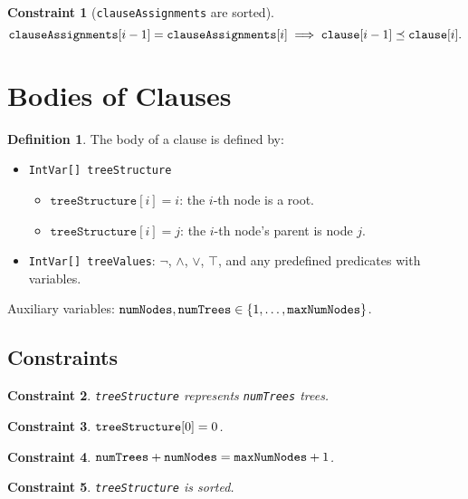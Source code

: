 \documentclass{article}
\newtheorem{constraint}{Constraint}
\theoremstyle{definition}
\newtheorem{definition}{Definition}
\newcommand{\variable}[1]{\texttt{\textup{#1}}}
\begin{document}
\begin{constraint}[\variable{clauseAssignments} are sorted]
  \[
    \variable{clauseAssignments}[i-1] = \variable{clauseAssignments}[i] \implies
    \variable{clause}[i-1] \preceq \variable{clause}[i].
  \]
\end{constraint}

\section{Bodies of Clauses}

\begin{definition}
  The body of a clause is defined by:
  \begin{itemize}
  \item \variable{IntVar[] treeStructure}
    \begin{itemize}
    \item $\texttt{treeStructure}[i] = i$: the $i$-th node is a root.
    \item $\texttt{treeStructure}[i] = j$: the $i$-th node's parent is node $j$.
    \end{itemize}
  \item \variable{IntVar[] treeValues}: $\neg$, $\land$, $\lor$, $\top$, and any
    predefined predicates with variables.
  \end{itemize}
\end{definition}

Auxiliary variables: $\variable{numNodes}, \variable{numTrees} \in \{ 1, \dots,
\variable{maxNumNodes} \}$.

\subsection{Constraints}

\begin{constraint}
  \variable{treeStructure} represents \variable{numTrees} trees.
\end{constraint}

\begin{constraint}
  $\variable{treeStructure}[0] = 0$.
\end{constraint}

\begin{constraint}
  $\variable{numTrees} + \variable{numNodes} = \variable{maxNumNodes} + 1$.
\end{constraint}

\begin{constraint}
  \variable{treeStructure} is sorted.
\end{constraint}
\end{document}
